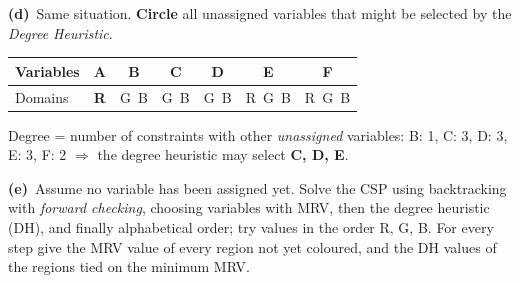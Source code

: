 \documentclass[11pt,a4paper]{article}
\newcommand{\subq}[1]{\par\smallskip\noindent\textbf{#1}\ }
\begin{document}
\subq{(d)}Same situation. \textbf{Circle} all unassigned variables that might be selected by the \emph{Degree Heuristic}.\begin{center}\small\begin{tabular}{|l|c|c|c|c|c|c|}\hline Variables & \textbf{A} & \textbf{B} & \textbf{C} & \textbf{D} & \textbf{E} & \textbf{F}\\ \hline Domains & \textbf{R} & G\ B & G\ B & G\ B & R\ G\ B & R\ G\ B\\ \hline\end{tabular}\end{center}
\begin{solbox}
Degree = number of constraints with other \emph{unassigned} variables: B: 1, C: 3, D: 3, E: 3, F: 2 $\Rightarrow$ the degree heuristic may select \textbf{C, D, E}.
\end{solbox}
\subq{(e)}Assume no variable has been assigned yet. Solve the CSP using backtracking with \emph{forward checking}, choosing variables with MRV, then the degree heuristic (DH), and finally alphabetical order; try values in the order R, G, B. For every step give the MRV value of every region not yet coloured, and the DH values of the regions tied on the minimum MRV.
\end{document}

